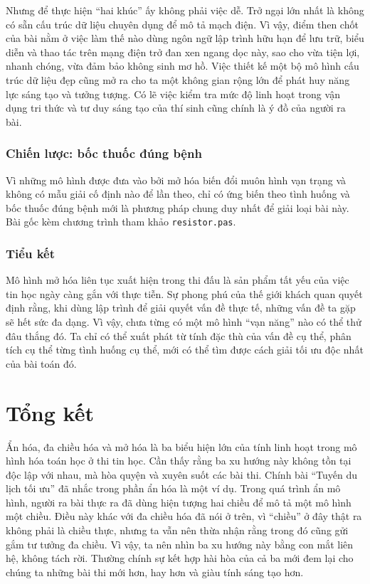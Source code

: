 \documentclass[11pt]{article}
\begin{document}
Nhưng để thực hiện ``hai khúc'' ấy không phải việc dễ. Trở ngại lớn nhất là
không có sẵn cấu trúc dữ liệu chuyên dụng để mô tả mạch điện. Vì vậy, điểm
then chốt của bài nằm ở việc làm thế nào dùng ngôn ngữ lập trình hữu hạn để
lưu trữ, biểu diễn và thao tác trên mạng điện trở đan xen ngang dọc này, sao
cho vừa tiện lợi, nhanh chóng, vừa đảm bảo không sinh mơ hồ. Việc thiết kế
một bộ mô hình cấu trúc dữ liệu đẹp cũng mở ra cho ta một không gian rộng lớn
để phát huy năng lực sáng tạo và tưởng tượng. Có lẽ việc kiểm tra mức độ linh
hoạt trong vận dụng tri thức và tư duy sáng tạo của thí sinh cũng chính là ý
đồ của người ra bài.

\subsubsection{Chiến lược: bốc thuốc đúng bệnh}

Vì những mô hình được đưa vào bởi mở hóa biến đổi muôn hình vạn trạng và
không có mẫu giải cố định nào để lần theo, chỉ có ứng biến theo tình huống và
bốc thuốc đúng bệnh mới là phương pháp chung duy nhất để giải loại bài này.
Bài gốc kèm chương trình tham khảo \texttt{resistor.pas}.

\subsubsection{Tiểu kết}

Mô hình mở hóa liên tục xuất hiện trong thi đấu là sản phẩm tất yếu của việc
tin học ngày càng gắn với thực tiễn. Sự phong phú của thế giới khách quan
quyết định rằng, khi dùng lập trình để giải quyết vấn đề thực tế, những vấn
đề ta gặp sẽ hết sức đa dạng. Vì vậy, chưa từng có một mô hình ``vạn năng''
nào có thể thử đâu thắng đó. Ta chỉ có thể xuất phát từ tính đặc thù của vấn
đề cụ thể, phân tích cụ thể từng tình huống cụ thể, mới có thể tìm được cách
giải tối ưu độc nhất của bài toán đó.

\section{Tổng kết}

Ẩn hóa, đa chiều hóa và mở hóa là ba biểu hiện lớn của tính linh hoạt trong
mô hình hóa toán học ở thi tin học. Cần thấy rằng ba xu hướng này không tồn
tại độc lập với nhau, mà hòa quyện và xuyên suốt các bài thi. Chính bài
``Tuyến du lịch tối ưu'' đã nhắc trong phần ẩn hóa là một ví dụ. Trong quá
trình ẩn mô hình, người ra bài thực ra đã dùng hiện tượng hai chiều để mô tả
một mô hình một chiều. Điều này khác với đa chiều hóa đã nói ở trên, vì
``chiều'' ở đây thật ra không phải là chiều thực, nhưng ta vẫn nên thừa nhận
rằng trong đó cũng gửi gắm tư tưởng đa chiều. Vì vậy, ta nên nhìn ba xu
hướng này bằng con mắt liên hệ, không tách rời. Thường chính sự kết hợp hài
hòa của cả ba mới đem lại cho chúng ta những bài thi mới hơn, hay hơn và giàu
tính sáng tạo hơn.
\end{document}
